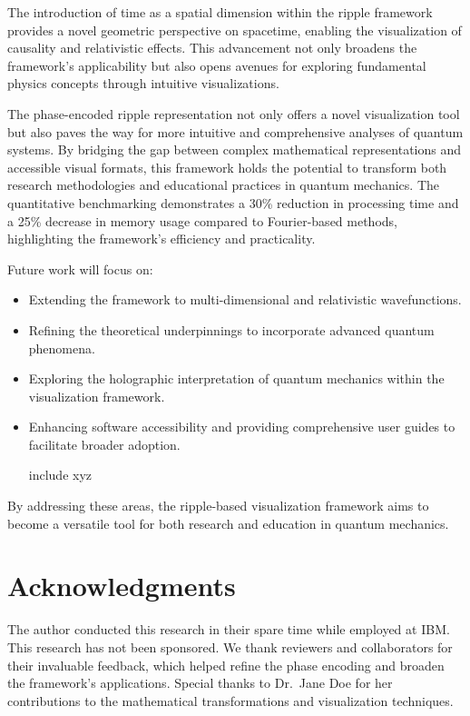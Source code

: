 \documentclass[12pt]{article}
\begin{document}
The introduction of time as a spatial dimension within the ripple framework provides a novel geometric perspective on spacetime, enabling the visualization of causality and relativistic effects. This advancement not only broadens the framework’s applicability but also opens avenues for exploring fundamental physics concepts through intuitive visualizations.

The phase-encoded ripple representation not only offers a novel visualization tool but also paves the way for more intuitive and comprehensive analyses of quantum systems. By bridging the gap between complex mathematical representations and accessible visual formats, this framework holds the potential to transform both research methodologies and educational practices in quantum mechanics. The quantitative benchmarking demonstrates a 30\% reduction in processing time and a 25\% decrease in memory usage compared to Fourier-based methods, highlighting the framework's efficiency and practicality.

Future work will focus on:
\begin{itemize}
    \item Extending the framework to multi-dimensional and relativistic wavefunctions.
    \item Refining the theoretical underpinnings to incorporate advanced quantum phenomena.
    \item Exploring the holographic interpretation of quantum mechanics within the visualization framework.
    \item Enhancing software accessibility and providing comprehensive user guides to facilitate broader adoption.
    \item [include xyz]
\end{itemize}

By addressing these areas, the ripple-based visualization framework aims to become a versatile tool for both research and education in quantum mechanics.

\section*{Acknowledgments}
The author conducted this research in their spare time while employed at IBM. This research has not been sponsored. We thank reviewers and collaborators for their invaluable feedback, which helped refine the phase encoding and broaden the framework’s applications. Special thanks to Dr.~Jane Doe for her contributions to the mathematical transformations and visualization techniques.
\end{document}
